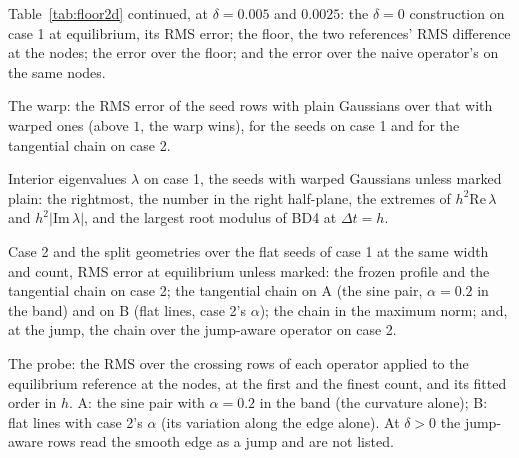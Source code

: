 \documentclass[11pt]{amsart}
\theoremstyle{definition}
\theoremstyle{remark}
\begin{document}
\begin{table}
  \centering
  \caption{Table~\ref{tab:floor2d} continued, at $\delta = 0.005$ and
  $0.0025$: the $\delta = 0$ construction on case 1 at equilibrium, its RMS
  error; the floor, the two references' RMS difference at the nodes; the
  error over the floor; and the error over the naive operator's on the same
  nodes.}
  \label{tab:floor2dthin}
  \footnotesize
  
\end{table}

\begin{table}
  \centering
  \caption{The warp: the RMS error of the seed rows with plain Gaussians over
  that with warped ones (above $1$, the warp wins), for the seeds on case 1
  and for the tangential chain on case 2.}
  \label{tab:warp2d}
  \footnotesize
  
\end{table}

\begin{table}
  \centering
  \caption{Interior eigenvalues $\lambda$ on case 1, the seeds with warped
  Gaussians unless marked plain: the rightmost, the number in the right
  half-plane, the extremes of $h^2 \mathrm{Re}\, \lambda$ and
  $h^2 |\mathrm{Im}\, \lambda|$, and the largest root modulus of BD4 at
  $\Delta t = h$.}
  \label{tab:spectra2d}
  \footnotesize
  
\end{table}

\begin{table}
  \centering
  \caption{Case 2 and the split geometries over the flat seeds of case 1 at
  the same width and count, RMS error at equilibrium unless marked: the
  frozen profile and the tangential chain on case 2; the tangential chain on
  A (the sine pair, $\alpha = 0.2$ in the band) and on B (flat lines, case
  2's $\alpha$); the chain in the maximum norm; and, at the jump, the chain
  over the jump-aware operator on case 2.}
  \label{tab:curvedratios2d}
  \footnotesize
  
\end{table}

\begin{table}
  \centering
  \caption{The probe: the RMS over the crossing rows of each operator applied
  to the equilibrium reference at the nodes, at the first and the finest
  count, and its fitted order in $h$. A: the sine pair with $\alpha = 0.2$ in
  the band (the curvature alone); B: flat lines with case 2's $\alpha$ (its
  variation along the edge alone). At $\delta > 0$ the jump-aware rows read
  the smooth edge as a jump and are not listed.}
  \label{tab:probe2d}
  \footnotesize
  
\end{table}
\end{document}
